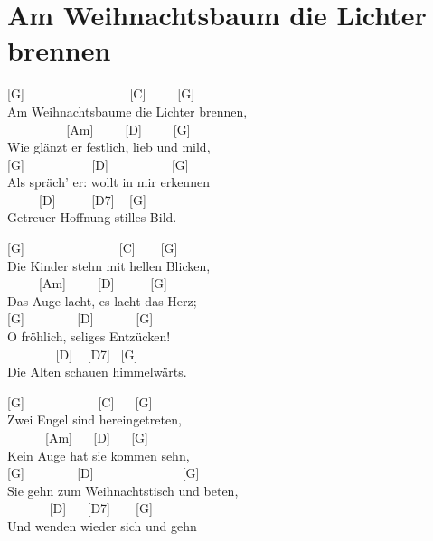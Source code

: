 \documentclass[
  letterpaper,
  twoside=false]{scrbook}
\begin{document}
\hypertarget{am-weihnachtsbaum-die-lichter-brennen}{%
\chapter{Am Weihnachtsbaum die Lichter
brennen}\label{am-weihnachtsbaum-die-lichter-brennen}}

{[}G{]} ~ ~ ~ ~ ~ ~ ~ ~ ~ ~{[}C{]} ~ ~ ~{[}G{]}\\
Am Weihnachtsbaume die Lichter brennen,\\
\hspace*{0.333em} ~ ~ ~ ~ ~ ~{[}Am{]} ~ ~ ~{[}D{]} ~ ~ ~{[}G{]}\\
Wie glänzt er festlich, lieb und mild,\\
{[}G{]} ~ ~ ~ ~ ~ ~ {[}D{]} ~ ~ ~ ~ ~ ~{[}G{]}\\
Als spräch' er: wollt in mir erkennen\\
\hspace*{0.333em} ~ ~ ~ {[}D{]} ~ ~ ~ {[}D7{]} ~ {[}G{]}\\
Getreuer Hoffnung stilles Bild.

{[}G{]} ~ ~ ~ ~ ~ ~ ~ ~ ~{[}C{]} ~ ~ {[}G{]}\\
Die Kinder stehn mit hellen Blicken,\\
\hspace*{0.333em} ~ ~ ~ {[}Am{]} ~ ~ ~{[}D{]} ~ ~ ~ {[}G{]}\\
Das Auge lacht, es lacht das Herz;\\
{[}G{]} ~ ~ ~ ~ ~{[}D{]} ~ ~ ~ ~{[}G{]}\\
O fröhlich, seliges Entzücken!\\
\hspace*{0.333em} ~ ~ ~ ~ ~{[}D{]} ~ {[}D7{]} ~{[}G{]}\\
Die Alten schauen himmelwärts.

{[}G{]} ~ ~ ~ ~ ~ ~ ~{[}C{]} ~ ~{[}G{]}\\
Zwei Engel sind hereingetreten,\\
\hspace*{0.333em} ~ ~ ~ ~{[}Am{]} ~ ~{[}D{]} ~ ~{[}G{]}\\
Kein Auge hat sie kommen sehn,\\
{[}G{]} ~ ~ ~ ~ ~{[}D{]} ~ ~ ~ ~ ~ ~ ~ ~ {[}G{]}\\
Sie gehn zum Weihnachtstisch und beten,\\
\hspace*{0.333em} ~ ~ ~ ~ {[}D{]} ~ ~{[}D7{]} ~ ~ {[}G{]}\\
Und wenden wieder sich und gehn
\end{document}
